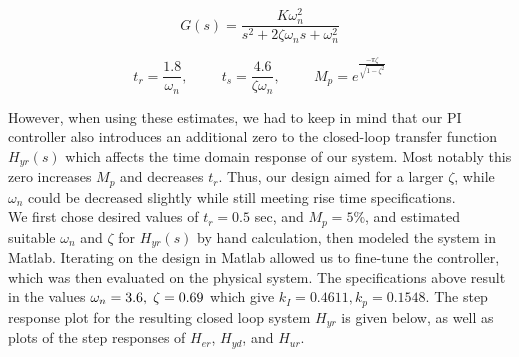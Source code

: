 \documentclass[11pt,titlepage]{article}
\begin{document}
	    \begin{equation}
	    	G(s)=\frac{K\omega_n^2}{s^2+2\zeta \omega_ns+\omega_{n}^2}
	    \end{equation}
	    
	    \begin{equation}
	    	t_r = \frac{1.8}{\omega_n}, \hspace{1cm} t_s=\frac{4.6}{\zeta\omega_n},  \hspace{1cm}  M_p=e^{\frac{-\pi \zeta}{\sqrt{1-\zeta^2}}}
	    \end{equation}
    
    	However, when using these estimates, we had to keep in mind that our PI controller also introduces an additional zero to the closed-loop transfer function $H_{yr}(s)$ which affects the time domain response of our system. Most notably this zero increases $M_p$ and decreases $t_r$. Thus, our design aimed for a larger $\zeta$, while $\omega_n$ could be decreased slightly while still meeting rise time specifications.\\
    
    	We first chose desired values of $t_r=0.5$ sec, and $M_p=5\%$, and estimated suitable $\omega_n$ and $\zeta$ for $H_{yr}(s)$ by hand calculation, then modeled the system in Matlab. Iterating on the design in Matlab allowed us to fine-tune the controller, which was then evaluated on the physical system. The specifications above result in the values $\omega_n=3.6, \hspace{0.1cm} \zeta=0.69 $ which give $k_I=0.4611 , k_p=0.1548$. The step response plot for the resulting closed loop system $H_{yr}$ is given below, as well as plots of the step responses of $H_{er}$, $H_{yd}$, and $H_{ur}$.
	
\end{document}
